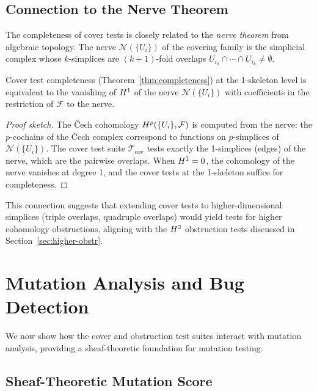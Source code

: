 \documentclass[11pt]{article}
\newcommand{\CoverSuite}{\mathcal{T}_{\mathrm{cov}}}
\begin{document}
\subsection{Connection to the Nerve Theorem}\label{sec:nerve}

The completeness of cover tests is closely related to the \emph{nerve
theorem} from algebraic topology.  The nerve $\mathcal{N}(\{U_i\})$ of
the covering family is the simplicial complex whose $k$-simplices are
$(k+1)$-fold overlaps $U_{i_0} \cap \cdots \cap U_{i_k} \neq \emptyset$.

\begin{lemma}\label{lem:nerve-cover}
Cover test completeness (Theorem~\ref{thm:completeness}) at the 1-skeleton
level is equivalent to the vanishing of $H^{1}$ of the nerve
$\mathcal{N}(\{U_i\})$ with coefficients in the restriction of
$\mathcal{F}$ to the nerve.
\end{lemma}

\begin{proof}[Proof sketch]
The \v{C}ech cohomology $H^{p}(\{U_i\}, \mathcal{F})$ is computed from
the nerve: the $p$-cochains of the \v{C}ech complex correspond to
functions on $p$-simplices of $\mathcal{N}(\{U_i\})$.  The cover test
suite $\CoverSuite$ tests exactly the 1-simplices (edges) of the nerve,
which are the pairwise overlaps.  When $H^{1} = 0$, the cohomology
of the nerve vanishes at degree 1, and the cover tests at the 1-skeleton
suffice for completeness.
\end{proof}

This connection suggests that extending cover tests to higher-dimensional
simplices (triple overlaps, quadruple overlaps) would yield tests for
higher cohomology obstructions, aligning with the $H^{2}$ obstruction
tests discussed in Section~\ref{sec:higher-obstr}.

\section{Mutation Analysis and Bug Detection}\label{sec:mutation}

We now show how the cover and obstruction test suites interact with
mutation analysis, providing a sheaf-theoretic foundation for mutation
testing.

\subsection{Sheaf-Theoretic Mutation Score}
\end{document}
